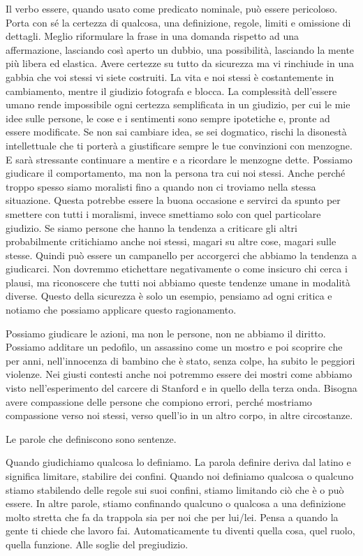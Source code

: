 \documentclass[12pt]{book} %
\begin{document}
Il verbo essere, quando usato come predicato nominale, può essere pericoloso. Porta con sé la certezza di qualcosa, una
definizione, regole, limiti e omissione di dettagli. Meglio riformulare la frase in una domanda rispetto ad una
affermazione, lasciando così aperto un dubbio, una possibilità, lasciando la mente più libera ed elastica. Avere
certezze su tutto da sicurezza ma vi rinchiude in una gabbia che voi stessi vi siete costruiti. La vita e noi stessi è
costantemente in cambiamento, mentre il giudizio fotografa e blocca. La complessità dell'essere
umano rende impossibile ogni certezza semplificata in un giudizio, per cui le mie idee sulle persone, le cose e i
sentimenti sono sempre ipotetiche e, pronte ad essere modificate.
Se non sai cambiare idea, se sei dogmatico, rischi la disonestà intellettuale che ti porterà a giustificare sempre le tue convinzioni con menzogne. E sarà stressante continuare a mentire e a ricordare le menzogne dette. Possiamo giudicare il comportamento, ma non la
persona tra cui noi stessi. Anche perché troppo spesso siamo moralisti fino a quando non ci troviamo nella stessa
situazione. Questa potrebbe essere la buona occasione e servirci da spunto per smettere con tutti i moralismi, invece
smettiamo solo con quel particolare giudizio. Se siamo persone che hanno la tendenza a criticare gli altri
probabilmente critichiamo anche noi stessi, magari su altre cose, magari sulle stesse. Quindi può essere un campanello
per accorgerci che abbiamo la tendenza a giudicarci. Non dovremmo etichettare negativamente o come insicuro chi cerca i
plausi, ma riconoscere che tutti noi abbiamo queste tendenze umane in modalità diverse. Questo della sicurezza è solo
un esempio, pensiamo ad ogni critica e notiamo che possiamo applicare questo ragionamento.

Possiamo giudicare le azioni, ma non le persone, non ne abbiamo il diritto. Possiamo additare un pedofilo, un assassino
come un mostro e poi scoprire che per anni, nell'innocenza di bambino che è stato, senza colpe, ha
subito le peggiori violenze. Nei giusti contesti anche noi potremmo essere dei mostri come abbiamo visto
nell'esperimento del carcere di Stanford e in quello della terza onda. Bisogna avere compassione
delle persone che compiono errori, perché mostriamo compassione verso noi stessi, verso quell'io
in un altro corpo, in altre circostanze.

Le parole che definiscono sono sentenze.

Quando giudichiamo qualcosa lo definiamo. La parola definire deriva dal latino e significa limitare, stabilire dei
confini. Quando noi definiamo qualcosa o qualcuno stiamo stabilendo delle regole sui suoi confini, stiamo limitando ciò
che è o può essere. In altre parole, stiamo confinando qualcuno o qualcosa a una definizione molto stretta che fa da
trappola sia per noi che per lui/lei. Pensa a quando la gente ti chiede che lavoro fai. Automaticamente tu diventi
quella cosa, quel ruolo, quella funzione. Alle soglie del pregiudizio.
\end{document}

